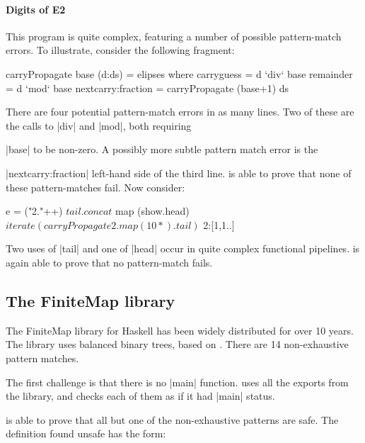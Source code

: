 \paragraph{Digits of E2}

This program is quite complex, featuring a number of possible pattern-match errors. To illustrate, consider the following fragment:

\begin{code}
carryPropagate base (d:ds) = elipses
  where  carryguess = d `div` base
         remainder = d `mod` base
         nextcarry:fraction = carryPropagate (base+1) ds
\end{code}

\noindent There are four potential pattern-match errors in as many lines. Two of these are the calls to |div| and |mod|, both requiring \ignore|base| to be non-zero. A possibly more subtle pattern match error is the \ignore|nextcarry:fraction| left-hand side of the third line. \catch{} is able to prove that none of these pattern-matches fail. Now consider:

\begin{code}
e =  ("2."++) $
     tail . concat $
     map (show.head) $
     iterate (carryPropagate 2 . map (10*) . tail) $
     2:[1,1..]
\end{code}

\noindent Two uses of |tail| and one of |head| occur in quite complex functional pipelines. \catch{} is again able to prove that no pattern-match fails.

\subsection{The FiniteMap library}
\label{sec:finitemap}

The FiniteMap library for Haskell has been widely distributed for over 10 years. The library uses balanced binary trees, based on \citep{adams:sets}. There are 14 non-exhaustive pattern matches.

The first challenge is that there is no |main| function. \catch{} uses all the exports from the library, and checks each of them as if it had |main| status.

\catch{} is able to prove that all but one of the non-exhaustive patterns are safe. The definition found unsafe has the form:

\begin{comment}
\begin{code}
data Branch a b = Branch a b
\end{code}
\end{comment}

